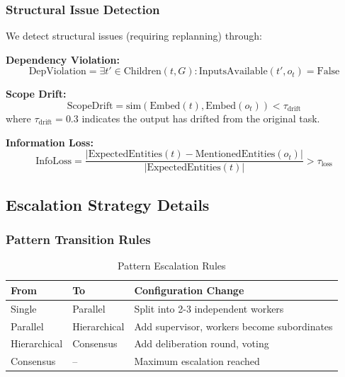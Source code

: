 \documentclass{article}
\theoremstyle{plain}
\theoremstyle{definition}
\theoremstyle{remark}
\begin{document}
\subsubsection{Structural Issue Detection}

We detect structural issues (requiring replanning) through:

\textbf{Dependency Violation:}
\begin{equation}
	\text{DepViolation} = \exists t' \in \text{Children}(t, G) : \text{InputsAvailable}(t', o_t) = \text{False}
\end{equation}

\textbf{Scope Drift:}
\begin{equation}
	\text{ScopeDrift} = \text{sim}(\text{Embed}(t), \text{Embed}(o_t)) < \tau_{\text{drift}}
\end{equation}
where $\tau_{\text{drift}} = 0.3$ indicates the output has drifted from the original task.

\textbf{Information Loss:}
\begin{equation}
	\text{InfoLoss} = \frac{|\text{ExpectedEntities}(t) - \text{MentionedEntities}(o_t)|}{|\text{ExpectedEntities}(t)|} > \tau_{\text{loss}}
\end{equation}

\subsection{Escalation Strategy Details}
\label{sec:rcm_escalation}

\subsubsection{Pattern Transition Rules}

\begin{table}[H]
	\centering
	\caption{Pattern Escalation Rules}
	\begin{tabular}{@{}lll@{}}
		\toprule
		\textbf{From} & \textbf{To} & \textbf{Configuration Change} \\
		\midrule
		Single & Parallel & Split into 2-3 independent workers \\
		Parallel & Hierarchical & Add supervisor, workers become subordinates \\
		Hierarchical & Consensus & Add deliberation round, voting \\
		Consensus & -- & Maximum escalation reached \\
		\bottomrule
	\end{tabular}
\end{table}
\end{document}
